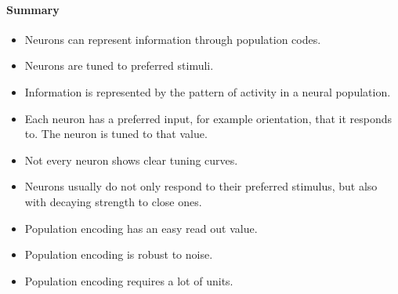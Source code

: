 \documentclass[main]{subfiles}
\begin{document}
\paragraph{Summary}
\begin{itemize}[noitemsep,nolistsep]
	\item Neurons can represent information through population codes.
	\item Neurons are tuned to preferred stimuli.
	\item Information is represented by the pattern of activity in a neural population.
	\item Each neuron has a preferred input, for example orientation, that it responds to. The neuron is tuned to that value.
	\item Not every neuron shows clear tuning curves.
	\item Neurons usually do not only respond to their preferred stimulus, but also with decaying strength to close ones.
	\item Population encoding has an easy read out value.
	\item Population encoding is robust to noise.
	\item Population encoding requires a lot of units.
\end{itemize}
\end{document}

